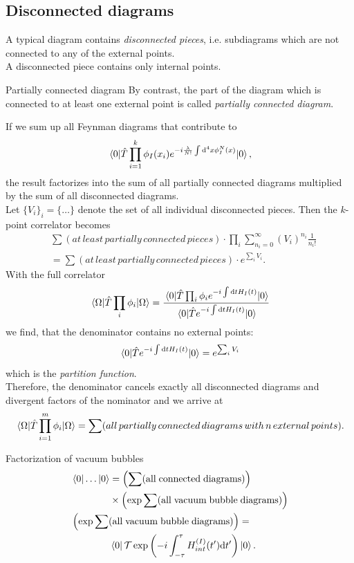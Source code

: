 \subsection{Disconnected diagrams}
A typical diagram contains \emph{disconnected pieces}, i.e. subdiagrams which are not connected to any of the external points.\\
A disconnected piece contains only internal points. \\
\begin{mybox}{Partially connected diagram}
	By contrast, the part of the diagram which is connected to at least one external point is called \emph{partially connected diagram}.
\end{mybox}
If we sum up all Feynman diagrams that contribute to
\begin{equation}
	\expval{\hat{T} \prod_{i=1}^{k} \phi_I(x_i) e^{-i \frac{\lambda}{N!} \int \mathrm{d}^4 x \phi^N_I(x)}}{0},
\end{equation}
the result factorizes into the sum of all partially connected diagrams multiplied by the sum of all disconnected diagrams.\\
Let $\{V_i\}_i = \{\dots \}$  denote the set of all individual disconnected pieces. Then the $k$-point correlator becomes
\begin{align}
&	\sum(at\,least\,partially\,connected\,pieces) \cdot \prod_i \sum_{n_i=0}^{\infty} (V_i)^{n_i} \frac{1}{n_i !} \\
&= \sum(at \, least\, partially\, connected\, pieces) \cdot e^{\sum_i V_i}.
\end{align}
With the full correlator 
\begin{equation}
	\expval{\hat{T}\prod_i \phi_i}{\Omega} = \frac{\expval{\hat{T} \prod_i \phi_i e^{-i \int \mathrm{d}t H_I(t)     } }{0}}{\expval{\hat{T}e^{-i \int \mathrm{d}t H_I(t)} }{0}}
\end{equation}
we find, that the denominator contains no external points:
\begin{equation}
	\expval{\hat{T} e^{-i \int \mathrm{d}t H_I(t)} }{0} = e^{\sum_i V_i} 
\end{equation}
which is the \emph{partition function}.\\
Therefore, the denominator cancels exactly all disconnected diagrams and divergent factors of the nominator and we arrive at
\begin{equation}
	\expval{\hat{T} \prod_{i=1}^{m} \phi_i }{\Omega} =\sum(all\,partially\,connected\,diagrams\, with\, n\, external \, points).
\end{equation}
\begin{mybox}{Factorization of vacuum bubbles}
		\begin{align*}
		&\bra{0}\dots \ket{0}= \left(\sum (\mathrm{all\;connected\;diagrams})\right)\\
		&\qquad \qquad \times \left(\exp \sum (\mathrm{all\;vacuum\;bubble\;diagrams})\right)\\
				&\left(\exp \sum (\mathrm{all\;vacuum\;bubble\;diagrams})\right) =\\
				&\qquad \qquad  \bra{0}\mathcal{T} \exp \left(-i \int_{-\tau}^{\tau} H^{(I)}_{int}(t^\prime) \mathrm{d} t^\prime\right)\ket{0}.
	\end{align*}
\end{mybox}
